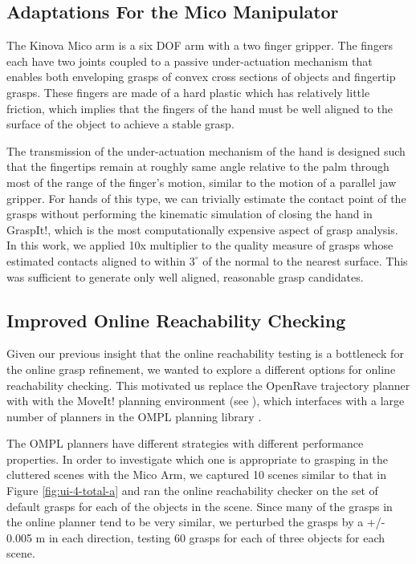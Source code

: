 \subsection{Adaptations For the Mico Manipulator}
The Kinova Mico arm is a six DOF arm with a two finger gripper. The fingers each have two joints coupled to a passive under-actuation mechanism that enables both enveloping grasps of convex cross sections of objects and fingertip grasps. These fingers are made of a hard plastic which has relatively little friction, which implies that the fingers of the hand must be well aligned to the surface of the object to achieve a stable grasp. 

The transmission of the under-actuation mechanism of the hand is designed such that the fingertips remain at roughly same angle relative to the palm through most of the range of the finger's motion, similar to the motion of a parallel jaw gripper. For hands of this type, we can trivially estimate the contact point of the grasps without performing the kinematic simulation of closing the hand in GraspIt!, which is the most computationally expensive aspect of grasp analysis. In this work, we applied 10x multiplier to the quality measure of grasps whose estimated contacts aligned to within $3^{\circ}$ of the normal to the nearest surface. This was sufficient to generate only well aligned, reasonable grasp candidates. 


\subsection{Improved Online Reachability Checking}
Given our previous insight that the online reachability testing is a bottleneck for the online grasp refinement, we wanted to explore a different options for online reachability checking. This motivated us replace the OpenRave trajectory planner with with the MoveIt! planning environment (see \cite{moveit}), which interfaces with a large number of planners in the OMPL planning library \cite{ompl}.

The OMPL planners have different strategies with different performance properties. In order to investigate which one is appropriate to grasping in the cluttered scenes with the Mico Arm, we captured 10 scenes similar to that in Figure \ref{fig:ui-4-total-a} and ran the online reachability checker on the set of default grasps for each of the objects in the scene. Since many of the grasps in the online planner tend to be very similar, we perturbed the grasps by a +/- 0.005 m in each direction, testing 60 grasps for each of three objects for each scene. 

